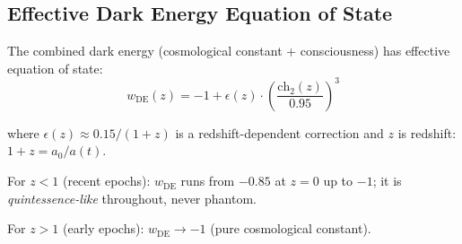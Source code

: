 \subsection{Effective Dark Energy Equation of State}

\begin{theorem}\label{thm:total-dark-energy-eos}
The combined dark energy (cosmological constant + consciousness) has effective equation of state:
\begin{equation}
\boxed{w_{\text{DE}}(z) = -1 + \epsilon(z) \cdot \left( \frac{\text{ch}_2(z)}{0.95} \right)^3}
\end{equation}

where $\epsilon(z) \approx 0.15 / (1+z)$ is a redshift-dependent correction and $z$ is redshift: $1+z = a_0 / a(t)$.

For $z < 1$ (recent epochs): $w_{\text{DE}}$ runs from $-0.85$ at $z = 0$ up to
$-1$; it is \emph{quintessence-like} throughout, never phantom.

For $z > 1$ (early epochs): $w_{\text{DE}} \to -1$ (pure cosmological constant).
\end{theorem}

